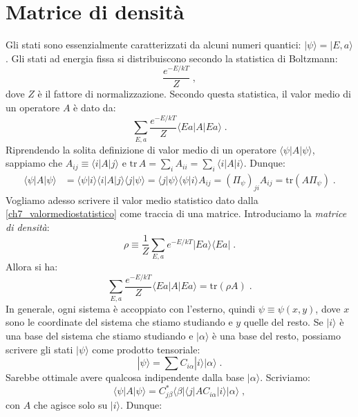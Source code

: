 \documentclass[12pt,a4paper]{report}
\theoremstyle{definition}
\numberwithin{equation}{section}
\newcommand{\bra}{\langle}
\newcommand{\ket}{\rangle}
\newcommand{\tr}{\mathrm{tr}}
\begin{document}
\section{Matrice di densità}
Gli stati sono essenzialmente caratterizzati da alcuni numeri quantici: $|\psi\ket=|E,a\ket$. Gli stati ad energia fissa si distribuiscono secondo la statistica di Boltzmann:
\begin{equation}
\frac{e^{-E/kT}}{Z}\;,
\end{equation}
dove $Z$ è il fattore di normalizzazione. Secondo questa statistica, il valor medio di un operatore $A$ è dato da:
\begin{equation}
\sum_{E,a} \frac{e^{-E/kT}}{Z}\bra Ea|A|Ea\ket\;. \label{ch7_valormediostatistico}
\end{equation}
Riprendendo la solita definizione di valor medio di un operatore $\bra \psi|A|\psi\ket$, sappiamo che $A_{ij}\equiv \bra i|A|j\ket$ e $\tr\, A=\sum_i A_{ii}=\sum_i \bra i|A|i\ket$. Dunque:
\begin{align}
\bra \psi|A|\psi\ket &= \bra\psi|i\ket\bra i|A|j\ket\bra j|\psi\ket = \bra j|\psi\ket\bra \psi|i\ket A_{ij} = \left(\Pi_{\psi}\right)_{ji}A_{ij} = \tr (A\Pi_{\psi})\;.
\end{align}
Vogliamo adesso scrivere il valor medio statistico dato dalla \eqref{ch7_valormediostatistico} come traccia di una matrice. Introduciamo la \textit{matrice di densità}:
\begin{equation}
\rho\equiv \frac{1}{Z}\sum_{E,a}e^{-E/kT}|Ea\ket\bra Ea|\;.
\end{equation}
Allora si ha:
\begin{equation}
\sum_{E,a} \frac{e^{-E/kT}}{Z}\bra Ea|A|Ea\ket=\tr (\rho A)\;.
\end{equation}
In generale, ogni sistema è accoppiato con l'esterno, quindi $\psi\equiv \psi(x,y)$, dove $x$ sono le coordinate del sistema che stiamo studiando e $y$ quelle del resto. Se $|i\ket$ è una base del sistema che stiamo studiando e $|\alpha\ket$ è una base del resto, possiamo scrivere gli stati $|\psi\ket$ come prodotto tensoriale:
\begin{equation}
|\psi\ket=\sum C_{i\alpha}|i\ket|\alpha\ket\;.
\end{equation}
Sarebbe ottimale avere qualcosa indipendente dalla base $|\alpha\ket$. Scriviamo:
\begin{equation}
\bra \psi|A|\psi\ket=C_{j\beta}^*\bra\beta|\bra j|AC_{i\alpha}|i\ket|\alpha\ket\;,
\end{equation}
con $A$ che agisce solo su $|i\ket$. Dunque:
\end{document}
